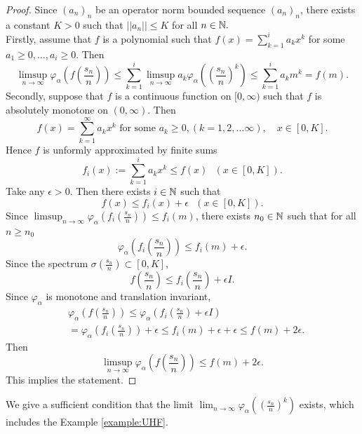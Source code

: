 \documentclass[a4paper,12pt]{amsart}
\begin{document}
\begin{proof} Since  $(a_n)_n$ be an operator norm bounded sequence $(a_n)_n$, there exists a constant $K > 0$ such that 
$||a_n||\leq K$ for all $n \in {\Bbb N}.$ \\

Firstly, assume that $f$ is a polynomial such that $f(x) = \sum_{k =1} ^i a_k x^k$ for some $a_1 \geq 0, \dots, a_i \geq 0$. 
Then 
$$
\limsup _{n \rightarrow \infty}  \varphi_{\alpha}(f(\frac{s_n}{n})) 
\leq \sum_{k=1} ^i \limsup _{n \rightarrow \infty} a_k \varphi_{\alpha}((\frac{s_n}{n})^k) 
\leq  \sum_{k =1} ^i a_k m^k = f(m) .
$$
Secondly, suppose that $f$ is a continuous function on $[0,\infty)$ such that $f$ is absolutely monotone  on $(0,\infty)$.  
Then 
$$
f(x) = \sum_{k =1} ^{\infty} a_k  x^k \text{ for some } a_k \geq 0, (k = 1,2,\ldots \infty), \quad  x \in [0,K]. 
$$
Hence  $f$ is unformly 
approximated by finite sums 
$$
f_i(x) := \sum_{k =1} ^i a_k x^k \leq f(x) \ \ \ (x \in [0,K]).
$$
Take any $\epsilon > 0$. Then there exists $i \in {\Bbb N}$ such that 
$$
f(x) \leq f_i(x) + \epsilon \ \ \ (x \in [0,K]). 
$$
Since $\limsup _{n \rightarrow \infty}  \varphi_{\alpha}(f_i(\frac{s_n}{n})) \leq f_i(m)$, 
there exists $n_0 \in {\Bbb N}$ such that for all $n \geq n_0$ 
$$
\varphi_{\alpha}(f_i(\frac{s_n}{n})) \leq f_i(m) + \epsilon. 
$$
Since the spectrum $\sigma(\frac{s_n}{n}) \subset [0,K]$, 
$$
f(\frac{s_n}{n}) \leq f_i(\frac{s_n}{n}) + \epsilon I. 
$$
Since $\varphi_{\alpha}$ is monotone and translation invariant, 
\begin{align*}
& \varphi_{\alpha} (f(\frac{s_n}{n}) )  \leq \varphi_{\alpha}( f_i(\frac{s_n}{n}) + \epsilon I) \\
& = \varphi_{\alpha}( f_i(\frac{s_n}{n})) + \epsilon \leq  f_i(m) + \epsilon +  \epsilon \leq f(m) + 2 \epsilon. 
\end{align*}
Then 
$$
\limsup _{n \rightarrow \infty}  \varphi_{\alpha}(f(\frac{s_n}{n})) \leq f(m) + 2 \epsilon.
$$
This implies the statement.
\end{proof}

We give a sufficient condition that the limit $\lim _{n \rightarrow \infty}  \varphi_{\alpha}((\frac{s_n}{n})^k)$ exists, 
which includes the Example \ref{example:UHF}. 
\end{document}
